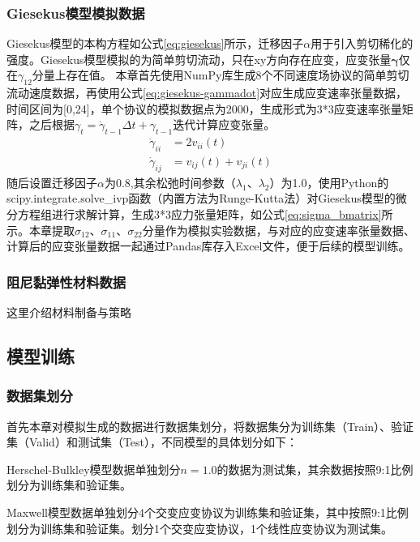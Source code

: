 \subsubsection{Giesekus模型模拟数据}
Giesekus模型的本构方程如公式\eqref{eq:giesekus}所示，迁移因子$\alpha$用于引入剪切稀化的强度。Giesekus模型模拟的为简单剪切流动，只在xy方向存在应变，应变张量$\boldsymbol{\gamma}$仅在$\gamma_{12}$分量上存在值。
本章首先使用NumPy库生成8个不同速度场协议的简单剪切流动速度数据，再使用公式\eqref{eq:giesekus-gammadot}对应生成应变速率张量数据，时间区间为[0,24]，单个协议的模拟数据点为2000，生成形式为3*3应变速率张量矩阵，之后根据$\gamma_{t}=\dot{\gamma}_{t-1}\Delta t+\gamma_{t-1}$迭代计算应变张量。
\begin{equation}
  \begin{aligned}
    \dot{\gamma}_{ii} & = 2 v_{ii}(t)           \\
    \dot{\gamma}_{ij} & = v_{ij}(t) + v_{ji}(t)
  \end{aligned} \label{eq:giesekus-gammadot}
\end{equation}
随后设置迁移因子$\alpha$为0.8,其余松弛时间参数（$\lambda_1$、$\lambda_2$）为1.0，使用Python的scipy.integrate.solve\_ivp函数（内置方法为Runge-Kutta法）对Giesekus模型的微分方程组进行求解计算，生成3*3应力张量矩阵，如公式\eqref{eq:sigma_bmatrix}所示。本章提取$\sigma_{12}$、$\sigma_{11}$、$\sigma_{22}$分量作为模拟实验数据，与对应的应变速率张量数据、计算后的应变张量数据一起通过Pandas库存入Excel文件，便于后续的模型训练。
\subsubsection{阻尼黏弹性材料数据}
这里介绍材料制备与策略
\subsection{模型训练}
\subsubsection{数据集划分}
首先本章对模拟生成的数据进行数据集划分，将数据集分为训练集（Train）、验证集（Valid）和测试集（Test），不同模型的具体划分如下：

Herschel-Bulkley模型数据单独划分$n=1.0$的数据为测试集，其余数据按照9:1比例划分为训练集和验证集。

Maxwell模型数据单独划分4个交变应变协议为训练集和验证集，其中按照9:1比例划分为训练集和验证集。划分1个交变应变协议，1个线性应变协议为测试集。

